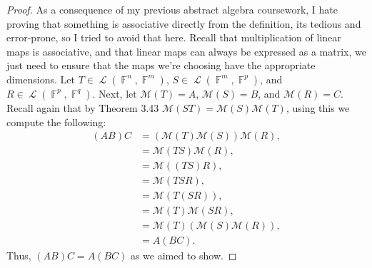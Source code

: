 \documentclass[letterpaper, 12pt]{amsart}
\DeclareMathOperator{\F}{\mathbb{F}}
\DeclareMathOperator{\Ell}{\mathscr{L}}
\theoremstyle{definition}  %
\begin{document}
		\begin{proof}
		As a consequence of my previous abstract algebra coursework, I hate proving that something is associative directly from the definition, its tedious and error-prone, so I tried to avoid that here.
		Recall that multiplication of linear maps is associative, and that linear maps can always be expressed as a matrix, we just need to ensure that the maps we're choosing have the appropriate dimensions.
		Let $T \in \Ell(\F^n,\F^m)$, $S \in \Ell(\F^m,\F^p)$, and $R \in \Ell(\F^p,\F^q)$.
		Next, let $\mathcal{M}(T) = A$, $\mathcal{M}(S) = B$, and $\mathcal{M}(R) = C$.
		Recall again that by Theorem 3.43 $\mathcal{M}(ST) = \mathcal{M}(S)\mathcal{M}(T)$, using this we compute the following:
			\begin{align*}
			(AB)C &= (\mathcal{M}(T)\mathcal{M}(S))\mathcal{M}(R), \\
			&= \mathcal{M}(TS)\mathcal{M}(R), \\
			&= \mathcal{M}((TS)R), \\
			&= \mathcal{M}(TSR), \\
			&= \mathcal{M}(T(SR)), \\
			&= \mathcal{M}(T)\mathcal{M}(SR), \\
			&= \mathcal{M}(T)(\mathcal{M}(S)\mathcal{M}(R)), \\
			&= A(BC).
			\end{align*}
		Thus, $(AB)C = A(BC)$ as we aimed to show.
			
		\end{proof}
\end{document}
